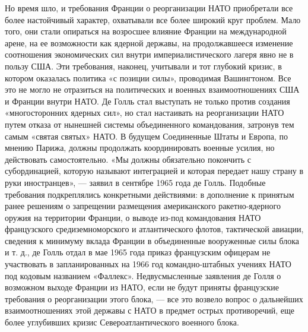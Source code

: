 \documentclass[12pt, a4paper, openany]{book}
\begin{document}
Но время шло, и требования Франции о реорганизации НАТО приобретали все более настойчивый характер, охватывали все более широкий круг проблем. Мало того, они стали опираться на возросшее влияние Франции на международной арене, на ее возможности как ядерной державы, на продолжавшееся изменение соотношения экономических сил внутри империалистического лагеря явно не в пользу США. Эти требования, наконец, учитывали и тот глубокий кризис, в котором оказалась политика «с позиции силы», проводимая Вашингтоном. Все это не могло не отразиться на политических и военных взаимоотношениях США и Франции внутри НАТО. Де Голль стал выступать не только против создания «многосторонних ядерных сил», но стал настаивать на реорганизации НАТО путем отказа от нынешней системы объединенного командования, затронув тем самым «святая святых» НАТО. В будущем Соединенные Штаты и Европа, по мнению Парижа, должны продолжать координировать военные усилия, но действовать самостоятельно. «Мы должны обязательно покончить с субординацией, которую называют интеграцией и которая передает нашу страну в руки иностранцев», — заявил в сентябре 1965 года де Голль. Подобные требования подкреплялись конкретными действиями: в дополнение к принятым ранее решениям о запрещении размещения американского ракетно-ядерного оружия на территории Франции, о выводе из-под командования НАТО французского средиземноморского и атлантического флотов, тактической авиации, сведения к минимуму вклада Франции в объединенные вооруженные силы блока и т. д., де Голль отдал в мае 1965 года приказ французским офицерам не участвовать в запланированных на 1966 год командно-штабных учениях НАТО под кодовым названием «Фаллекс». Недвусмысленные заявления де Голля о возможном выходе Франции из НАТО, если не будут приняты французские требования о реорганизации этого блока, — все это возвело вопрос о дальнейших взаимоотношениях этой державы с НАТО в предмет острых противоречий, еще более углубивших кризис Североатлантического военного блока.
		
\end{document}
